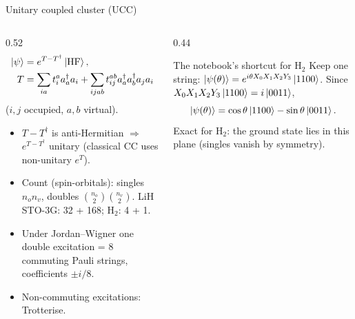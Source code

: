 \documentclass[aspectratio=169,11pt]{beamer}
\begin{document}
\begin{frame}{Unitary coupled cluster (UCC)}
  \begin{columns}[T]
    \begin{column}{0.52\textwidth}
      \[ \begin{aligned} \ket{\psi} &= e^{T - T^\dagger}\ket{\mathrm{HF}},\\ T &= \sum_{ia}t_i^aa_a^\dagger a_i + \sum_{ijab}t_{ij}^{ab}a_a^\dagger a_b^\dagger a_ja_i \end{aligned} \]
      ($i, j$ occupied, $a, b$ virtual).
      \begin{itemize}
        \item $T - T^\dagger$ is anti-Hermitian $\Rightarrow$ $e^{T - T^\dagger}$ unitary (classical CC uses non-unitary $e^T$).
        \item Count (spin-orbitals): singles $n_on_v$, doubles $\binom{n_o}{2}\binom{n_v}{2}$. LiH STO-3G: 32 + 168; H$_2$: 4 + 1.
        \item Under Jordan--Wigner one double excitation = 8 commuting Pauli strings, coefficients $\pm i/8$.
        \item Non-commuting excitations: Trotterise.
      \end{itemize}
    \end{column}
    \begin{column}{0.44\textwidth}
      \begin{block}{The notebook's shortcut for H$_2$}
        Keep one string: $\ket{\psi(\theta)} = e^{i\theta X_0X_1X_2Y_3}\ket{1100}$. Since $X_0X_1X_2Y_3\ket{1100} = i\ket{0011}$,
        \[ \ket{\psi(\theta)} = \cos\theta\ket{1100} - \sin\theta\ket{0011} . \]
        Exact for H$_2$: the ground state lies in this plane (singles vanish by symmetry).
      \end{block}
    \end{column}
  \end{columns}
\end{frame}
\end{document}
